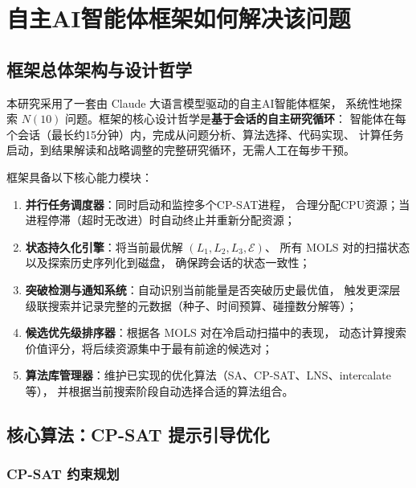 \documentclass[11pt,a4paper]{ctexart}
\theoremstyle{remark}
\newcommand{\E}{\mathcal{E}}
\newcommand{\MOLS}{\mathrm{MOLS}}
\begin{document}
\section{自主AI智能体框架如何解决该问题}
\label{sec:framework}

\subsection{框架总体架构与设计哲学}

本研究采用了一套由 Claude 大语言模型驱动的自主AI智能体框架，
系统性地探索 $N(10)$ 问题。框架的核心设计哲学是\textbf{基于会话的自主研究循环}：
智能体在每个会话（最长约15分钟）内，完成从问题分析、算法选择、代码实现、
计算任务启动，到结果解读和战略调整的完整研究循环，无需人工在每步干预。

框架具备以下核心能力模块：

\begin{enumerate}[leftmargin=2.5em,label=\textbf{模块\arabic*.}]
  \item \textbf{并行任务调度器}：同时启动和监控多个CP-SAT进程，
    合理分配CPU资源；当进程停滞（超时无改进）时自动终止并重新分配资源；
  \item \textbf{状态持久化引擎}：将当前最优解 $(L_1, L_2, L_3, \E)$、
    所有 $\MOLS$ 对的扫描状态以及探索历史序列化到磁盘，
    确保跨会话的状态一致性；
  \item \textbf{突破检测与通知系统}：自动识别当前能量是否突破历史最优值，
    触发更深层级联搜索并记录完整的元数据（种子、时间预算、碰撞数分解等）；
  \item \textbf{候选优先级排序器}：根据各 $\MOLS$ 对在冷启动扫描中的表现，
    动态计算搜索价值评分，将后续资源集中于最有前途的候选对；
  \item \textbf{算法库管理器}：维护已实现的优化算法（SA、CP-SAT、LNS、intercalate等），
    并根据当前搜索阶段自动选择合适的算法组合。
\end{enumerate}

\subsection{核心算法：CP-SAT 提示引导优化}

\subsubsection{CP-SAT 约束规划}
\end{document}
